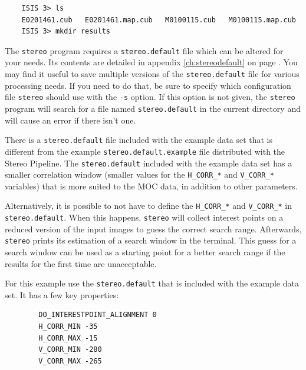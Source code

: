 \begin{verbatim}
    ISIS 3> ls
    E0201461.cub   E0201461.map.cub   M0100115.cub   M0100115.map.cub
    ISIS 3> mkdir results
\end{verbatim}
\noindent

The \texttt{stereo} program requires a \texttt{stereo.default} file
which can be altered for your needs.  Its contents are detailed in
appendix \ref{ch:stereodefault} on page \pageref{ch:stereodefault}.
You may find it useful to save multiple versions of the
\texttt{stereo.default} file for various processing needs. If you
need to do that, be sure to specify which configuration file
\texttt{stereo} should use with the \texttt{-s} option.  If this
option is not given, the \texttt{stereo} program will search for a
file named \texttt{stereo.default} in the current directory and
will cause an error if there isn't one.

There is a \texttt{stereo.default} file included with the example
data set that is different from the example \texttt{stereo.default.example}
file distributed with the Stereo Pipeline.  The \texttt{stereo.default}
included with the example data set has a smaller correlation window
(smaller values for the \texttt{H\_CORR\_*} and \texttt{V\_CORR\_*}
variables) that is more suited to the MOC data, in addition to other
parameters.

Alternatively, it is possible to not have to define the
\texttt{H\_CORR\_*} and \texttt{V\_CORR\_*} in
\texttt{stereo.default}. When this happens, \texttt{stereo} will
collect interest points on a reduced version of the input images to
guess the correct search range. Afterwards, \texttt{stereo} prints its
estimation of a search window in the terminal. This guess for a search
window can be used as a starting point for a better search range if
the results for the first time are unacceptable.

For this example use the \texttt{stereo.default} that is included with
the example data set. It has a few key properties:

\begin{verbatim}
        DO_INTERESTPOINT_ALIGNMENT 0
        H_CORR_MIN -35
        H_CORR_MAX -15
        V_CORR_MIN -280
        V_CORR_MAX -265
\end{verbatim}
\noindent

